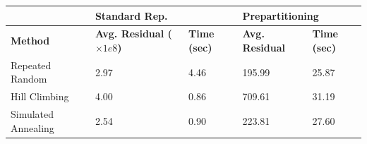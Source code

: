 \documentclass[a4paper]{article}
\begin{document}
\begin{tabular}{l|ll|ll}
\textbf{}           & \multicolumn{2}{l|}{\textbf{Standard Rep.}}               & \multicolumn{2}{l|}{\textbf{Prepartitioning}} \\ \hline
\textbf{Method}     & \textbf{Avg. Residual ($\times 1e8$)} & \textbf{Time (sec)} & \textbf{Avg. Residual}  & \textbf{Time (sec)} \\ \hline
Repeated Random     & 2.97                                & 4.46                & 195.99                  & 25.87               \\
Hill Climbing       & 4.00                                & 0.86                & 709.61                  & 31.19               \\
Simulated Annealing & 2.54                                & 0.90                & 223.81                  & 27.60              
\end{tabular}
	
\end{document}
